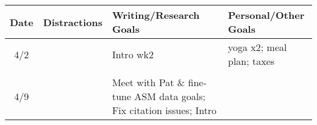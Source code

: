 \documentclass[]{article}
\begin{document}
\begin{longtable}[]{@{}clll@{}}
\toprule
\begin{minipage}[b]{0.04\columnwidth}\centering\strut
Date\strut
\end{minipage} & \begin{minipage}[b]{0.24\columnwidth}\raggedright\strut
Distractions\strut
\end{minipage} & \begin{minipage}[b]{0.33\columnwidth}\raggedright\strut
Writing/Research Goals\strut
\end{minipage} & \begin{minipage}[b]{0.28\columnwidth}\raggedright\strut
Personal/Other Goals\strut
\end{minipage}\tabularnewline
\midrule
\endhead
\begin{minipage}[t]{0.04\columnwidth}\centering\strut
4/2\strut
\end{minipage} & \begin{minipage}[t]{0.24\columnwidth}\raggedright\strut
\strut
\end{minipage} & \begin{minipage}[t]{0.33\columnwidth}\raggedright\strut
Intro wk2\strut
\end{minipage} & \begin{minipage}[t]{0.28\columnwidth}\raggedright\strut
yoga x2; meal plan; taxes\strut
\end{minipage}\tabularnewline
\begin{minipage}[t]{0.04\columnwidth}\centering\strut
\strut
\end{minipage} & \begin{minipage}[t]{0.24\columnwidth}\raggedright\strut
\strut
\end{minipage} & \begin{minipage}[t]{0.33\columnwidth}\raggedright\strut
\strut
\end{minipage} & \begin{minipage}[t]{0.28\columnwidth}\raggedright\strut
\strut
\end{minipage}\tabularnewline
\begin{minipage}[t]{0.04\columnwidth}\centering\strut
4/9\strut
\end{minipage} & \begin{minipage}[t]{0.24\columnwidth}\raggedright\strut
\strut
\end{minipage} & \begin{minipage}[t]{0.33\columnwidth}\raggedright\strut
Meet with Pat \& fine-tune ASM data goals; Fix citation issues; Intro

\end{minipage}
\end{longtable}
\end{document}
